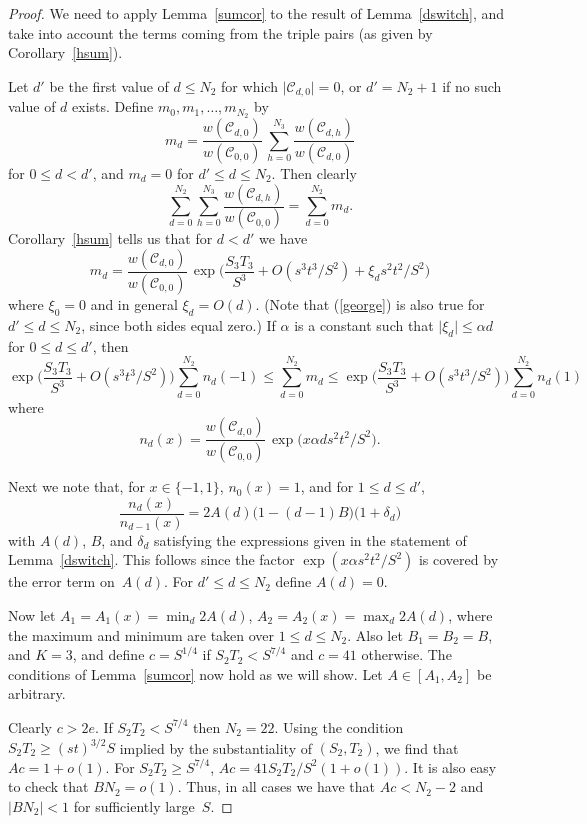 \documentclass[12pt]{article}
\numberwithin{equation}{section}
\def\C{{\mathcal{C}}}
\def\({\bigl(}   \def\){\bigr)}
\def\abs#1{\mathopen|#1\mathclose|} \let\card=\abs
\def\ac#1{\card{\C_{#1}}}
\begin{document}
\begin{proof}
We need to apply Lemma~\ref{sumcor} to
the result of Lemma~\ref{dswitch}, and take into account the terms coming
from the triple pairs (as given by Corollary~\ref{hsum}).

Let $d'$ be the first value of $d\leq N_2$ for which $\ac{d,0}=0$,
or $d'=N_2+1$ if no such value of $d$ exists.
Define $m_0,m_1,\ldots,m_{N_2}$ by
$$ m_d = 
  \frac{w(\C_{d,0})}{w(\C_{0,0})}\, \sum_{h=0}^{N_3} \frac{w(\C_{d,h})}{w(\C_{d,0})}
$$
for $0\leq d < d'$, and $m_d=0$ for $d'\leq d\leq N_2$.
Then clearly
\[ \sum_{d=0}^{N_2}\sum_{h=0}^{N_3} \frac{w(\C_{d,h})}{w(\C_{0,0})} =
\sum_{d=0}^{N_2} m_d.\] 
Corollary~\ref{hsum} tells us that for $d< d'$ we have
\begin{equation}
 m_d =  \frac{w(\C_{d,0})}{w(\C_{0,0})}\, 
  \exp\biggl( \frac{S_3T_3}{S^3} + O(s^3t^3/S^2) + \xi_d s^2t^2/S^2\biggl) 
\label{george}
\end{equation}
where $\xi_0=0$ and in general $\xi_d = O(d)$.   (Note that (\ref{george})
is also true for $d'\leq d\leq N_2$, since both sides
equal zero.)
If $\alpha$ is a constant
such that $\abs{\xi_d} \le \alpha d$ for $0\le d\le d'$, then
\begin{equation}\label{msum}
  \exp\biggl( \frac{S_3T_3}{S^3} + O(s^3t^3/S^2)\biggl)
  \sum_{d=0}^{N_2} n_d(-1) \le \sum_{d=0}^{N_2} m_d \le 
 \exp\biggl( \frac{S_3T_3}{S^3} + O(s^3t^3/S^2)\biggl)
 \sum_{d=0}^{N_2}n_d(1)
\end{equation}
where
$$ n_d(x) =  \frac{w(\C_{d,0})}{w(\C_{0,0})}\, \exp\(x \alpha d s^2t^2/S^2\).$$

Next we note that, for $x\in\{-1,1\}$, $n_0(x)=1$, and for
$1\le d\le d'$,
\[
  \frac{n_d(x)}{n_{d-1}(x)} = 2A(d)\(1 - (d-1)B\) \(1 + \delta_d\)
\]
with $A(d)$, $B$, and $\delta_d$ satisfying the expressions given in the
statement of Lemma~\ref{dswitch}. This follows since the factor
$\exp(x \alpha s^2t^2/S^2)$ is covered by the error term on~$A(d)$.
For $d'\leq d\leq N_2$ define $A(d)=0$.

\smallskip

Now let $A_1=A_1(x) = \min_d 2 A(d)$, $A_2=A_2(x)=\max_d 2 A(d)$,
where the maximum and minimum are taken over $1\leq d\leq N_2$.
Also let $B_1=B_2=B$, and $K=3$, and define $c=S^{1/4}$
if $S_2T_2<S^{7/4}$ and $c=41$ otherwise.
The conditions of Lemma~\ref{sumcor} now hold as we will show.
Let $A\in [A_1,A_2]$ be arbitrary.

Clearly $c>2e$.
If $S_2T_2 < S^{7/4}$ then $N_2=22$.  Using the condition
$S_2T_2\ge (st)^{3/2}S$ implied by the substantiality of
$(S_2,T_2)$, we find that $Ac = 1+o(1)$.
For $S_2T_2 \ge S^{7/4}$, $Ac = 41 S_2T_2/S^2(1+o(1))$.
It is also easy to check that $BN_2 = o(1)$.
Thus, in all cases we have that $Ac<N_2-2$ and
$\abs{BN_2}<1$ for sufficiently large~$S$.


\end{proof}
\end{document}
